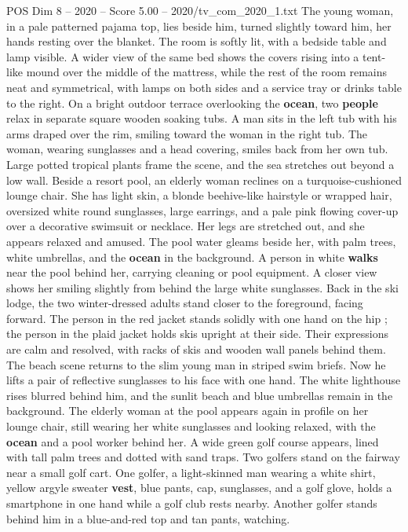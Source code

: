 \begin{textsample}{POS Dim 8 – 2020 – Score 5.00 – 2020/tv\_com\_2020\_1.txt}
The young woman, in a pale patterned pajama top, lies beside him, turned slightly toward him, her hands resting over the blanket.
The room is softly lit, with a bedside table and lamp visible.
A wider view of the same bed shows the covers rising into a tent-like mound over the middle of the mattress, while the rest of the room remains neat and symmetrical, with lamps on both sides and a service tray or drinks table to the right.
On a bright outdoor terrace overlooking the \textbf{ocean}, two \textbf{people} relax in separate square wooden soaking tubs.
A man sits in the left tub with his arms draped over the rim, smiling toward the woman in the right tub.
The woman, wearing sunglasses and a head covering, smiles back from her own tub.
Large potted tropical plants frame the scene, and the sea stretches out beyond a low wall.
Beside a resort pool, an elderly woman reclines on a turquoise-cushioned lounge chair.
She has light skin, a blonde beehive-like hairstyle or wrapped hair, oversized white round sunglasses, large earrings, and a pale pink flowing cover-up over a decorative swimsuit or necklace.
Her legs are stretched out, and she appears relaxed and amused.
The pool water gleams beside her, with palm trees, white umbrellas, and the \textbf{ocean} in the background.
A person in white \textbf{walks} near the pool behind her, carrying cleaning or pool equipment.
A closer view shows her smiling slightly from behind the large white sunglasses.
Back in the ski lodge, the two winter-dressed adults stand closer to the foreground, facing forward.
The person in the red jacket stands solidly with one hand on the hip ; the person in the plaid jacket holds skis upright at their side.
Their expressions are calm and resolved, with racks of skis and wooden wall panels behind them.
The beach scene returns to the slim young man in striped swim briefs.
Now he lifts a pair of reflective sunglasses to his face with one hand.
The white lighthouse rises blurred behind him, and the sunlit beach and blue umbrellas remain in the background.
The elderly woman at the pool appears again in profile on her lounge chair, still wearing her white sunglasses and looking relaxed, with the \textbf{ocean} and a pool worker behind her.
A wide green golf course appears, lined with tall palm trees and dotted with sand traps.
Two golfers stand on the fairway near a small golf cart.
One golfer, a light-skinned man wearing a white shirt, yellow argyle sweater \textbf{vest}, blue pants, cap, sunglasses, and a golf glove, holds a smartphone in one hand while a golf club rests nearby.
Another golfer stands behind him in a blue-and-red top and tan pants, watching.

\end{textsample}
